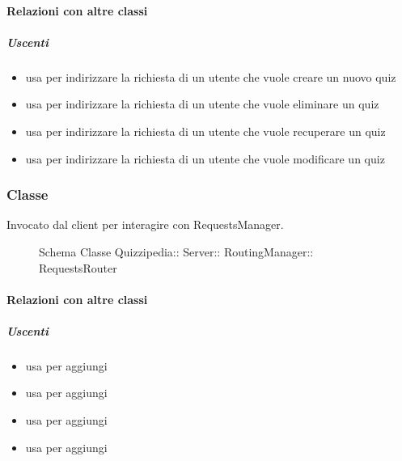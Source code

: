 \paragraph{Relazioni con altre classi}
\subparagraph{Uscenti}
\begin{itemize}
\item usa  per indirizzare la richiesta di un utente che vuole creare un nuovo quiz
\item usa  per indirizzare la richiesta di un utente che vuole eliminare un quiz
\item usa  per indirizzare la richiesta di un utente che vuole recuperare un quiz
\item usa  per indirizzare la richiesta di un utente che vuole modificare un quiz
\end{itemize}
\subsubsection{Classe }
Invocato dal client per interagire con RequestsManager.
\begin{figure}[H]
\centering
\noindent{}
\caption[Schema Classe RequestsRouter]{Schema Classe Quizzipedia:: Server:: RoutingManager:: RequestsRouter}
\end{figure}
\paragraph{Relazioni con altre classi}
\subparagraph{Uscenti}
\begin{itemize}
\item usa  per aggiungi
\item usa  per aggiungi
\item usa  per aggiungi
\item usa  per aggiungi
\end{itemize}
